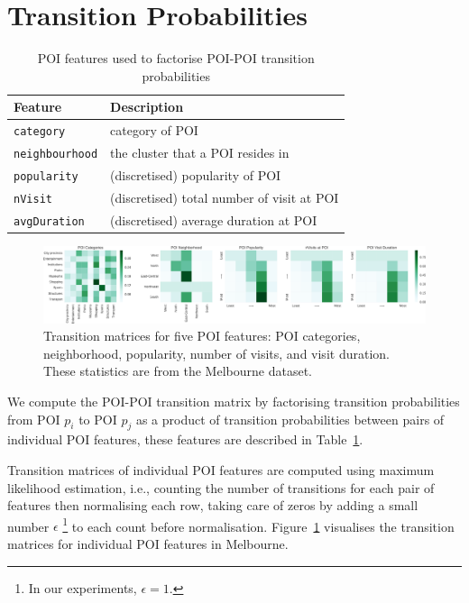 \section{Transition Probabilities}

\begin{table}[ht]
\caption{POI features used to factorise POI-POI transition probabilities}
\label{tab:featuretran}
\centering
\setlength{\tabcolsep}{28pt} %
\begin{tabular}{l|l} \hline
\textbf{Feature}       & \textbf{Description} \\ \hline
\texttt{category}      & category of POI \\
\texttt{neighbourhood} & the cluster that a POI resides in \\
\texttt{popularity}    & (discretised) popularity of POI \\
\texttt{nVisit}        & (discretised) total number of visit at POI \\
\texttt{avgDuration}   & (discretised) average duration at POI \\ \hline
\end{tabular}
\end{table}


\begin{figure}[b]
\includegraphics[width=\textwidth]{fig/poi_transmat_all.png}
\caption{Transition matrices for five POI features: POI categories, neighborhood, popularity, number of visits, and visit duration. These statistics are from the Melbourne dataset.}
\label{fig:transmat}
\end{figure}

We compute the POI-POI transition matrix by factorising transition probabilities from POI $p_i$ to POI $p_j$ as a product of transition probabilities
between pairs of individual POI features, these features are described in Table~\ref{tab:featuretran}.

Transition matrices of individual POI features are computed using maximum likelihood estimation,
i.e., counting the number of transitions for each pair of features then normalising each row,
taking care of zeros by adding a small number $\epsilon$
\footnote{In our experiments, $\epsilon = 1$.}
to each count before normalisation.
Figure~\ref{fig:transmat} visualises the transition matrices for individual POI features in Melbourne.

